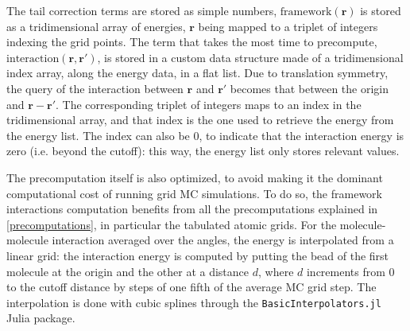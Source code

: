 \documentclass[main.tex]{subfiles}
\begin{document}
The tail correction terms are stored as simple numbers, $\text{framework}(\boldsymbol r)$ is stored as a tridimensional array of energies, $\boldsymbol r$ being mapped to a triplet of integers indexing the grid points. The term that takes the most time to precompute, $\text{interaction}(\boldsymbol r, \boldsymbol r')$, is stored in a custom data structure made of a tridimensional index array, along the energy data, in a flat list. Due to translation symmetry, the query of the interaction between $\boldsymbol r$ and $\boldsymbol r'$ becomes that between the origin and $\boldsymbol r - \boldsymbol r'$. The corresponding triplet of integers maps to an index in the tridimensional array, and that index is the one used to retrieve the energy from the energy list. The index can also be 0, to indicate that the interaction energy is zero (i.e. beyond the cutoff): this way, the energy list only stores relevant values.

The precomputation itself is also optimized, to avoid making it the dominant computational cost of running grid MC simulations. To do so, the framework interactions computation benefits from all the precomputations explained in \cref{precomputations}, in particular the tabulated atomic grids. For the molecule-molecule interaction averaged over the angles, the energy is interpolated from a linear grid: the interaction energy is computed by putting the bead of the first molecule at the origin and the other at a distance $d$, where $d$ increments from 0 to the cutoff distance by steps of one fifth of the average MC grid step. The interpolation is done with cubic splines through the \texttt{BasicInterpolators.jl} Julia package.
\end{document}
